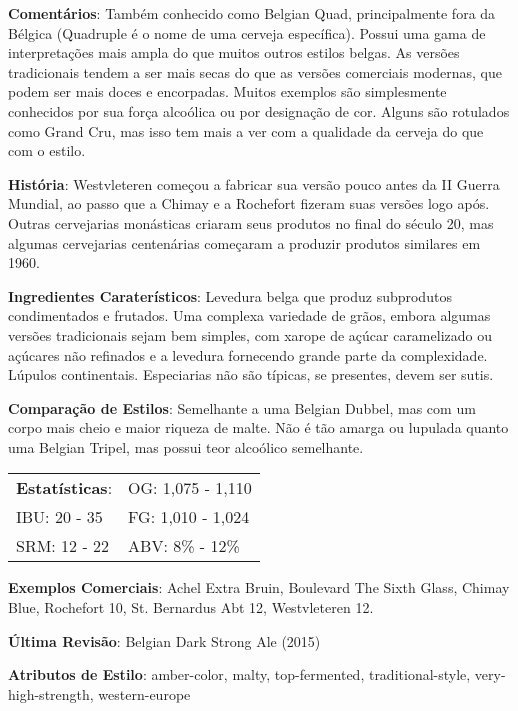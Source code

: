 \textbf{Comentários}: Também conhecido como Belgian Quad, principalmente fora da Bélgica (Quadruple é o nome de uma cerveja específica). Possui uma gama de interpretações mais ampla do que muitos outros estilos belgas. As versões tradicionais tendem a ser mais secas do que as versões comerciais modernas, que podem ser mais doces e encorpadas. Muitos exemplos são simplesmente conhecidos por sua força alcoólica ou por designação de cor. Alguns são rotulados como Grand Cru, mas isso tem mais a ver com a qualidade da cerveja do que com o estilo.

\textbf{História}: Westvleteren começou a fabricar sua versão pouco antes da II Guerra Mundial, ao passo que a Chimay e a Rochefort fizeram suas versões logo após. Outras cervejarias monásticas criaram seus produtos no final do século 20, mas algumas cervejarias centenárias começaram a produzir produtos similares em 1960.

\textbf{Ingredientes Caraterísticos}: Levedura belga que produz subprodutos condimentados e frutados. Uma complexa variedade de grãos, embora algumas versões tradicionais sejam bem simples, com xarope de açúcar caramelizado ou açúcares não refinados e a levedura fornecendo grande parte da complexidade. Lúpulos continentais. Especiarias não são típicas, se presentes, devem ser sutis.

\textbf{Comparação de Estilos}: Semelhante a uma Belgian Dubbel, mas com um corpo mais cheio e maior riqueza de malte. Não é tão amarga ou lupulada quanto uma Belgian Tripel, mas possui teor alcoólico semelhante.

\begin{tabular}{@{}p{35mm}p{35mm}@{}}
  \textbf{Estatísticas}: & OG: 1,075 - 1,110 \\
  IBU: 20 - 35  & FG: 1,010 - 1,024  \\
  SRM: 12 - 22  & ABV: 8\% - 12\%
\end{tabular}

\textbf{Exemplos Comerciais}: Achel Extra Bruin, Boulevard The Sixth Glass, Chimay Blue, Rochefort 10, St. Bernardus Abt 12, Westvleteren 12.

\textbf{Última Revisão}: Belgian Dark Strong Ale (2015)

\textbf{Atributos de Estilo}: amber-color, malty, top-fermented, traditional-style, very-high-strength, western-europe
